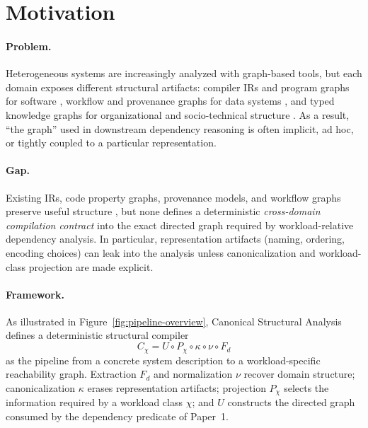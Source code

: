 \documentclass[11pt]{article}
\begin{document}
\section{Motivation}
\label{sec:motivation}
\paragraph{Problem.}
Heterogeneous systems are increasingly analyzed with graph-based tools, but each domain exposes different structural artifacts: compiler IRs and program graphs for software \cite{llvmLangRef,mlirDoc}, workflow and provenance graphs for data systems \cite{w3cprov,deelman2009}, and typed knowledge graphs for organizational and socio-technical structure \cite{hogan2021}. As a result, ``the graph'' used in downstream dependency reasoning is often implicit, ad hoc, or tightly coupled to a particular representation.

\paragraph{Gap.}
Existing IRs, code property graphs, provenance models, and workflow graphs preserve useful structure \cite{llvmLangRef,mlirDoc,yamaguchi2014cpg,w3cprov,deelman2009}, but none defines a deterministic \emph{cross-domain compilation contract} into the exact directed graph required by workload-relative dependency analysis. In particular, representation artifacts (naming, ordering, encoding choices) can leak into the analysis unless canonicalization and workload-class projection are made explicit.

\paragraph{Framework.}
As illustrated in Figure~\ref{fig:pipeline-overview}, Canonical Structural Analysis defines a deterministic structural compiler
\[
C_\chi = U \circ P_\chi \circ \kappa \circ \nu \circ F_d
\]
as the pipeline from a concrete system description to a workload-specific reachability graph. Extraction $F_d$ and normalization $\nu$ recover domain structure; canonicalization $\kappa$ erases representation artifacts; projection $P_\chi$ selects the information required by a workload class $\chi$; and $U$ constructs the directed graph consumed by the dependency predicate of Paper~1.
\end{document}

